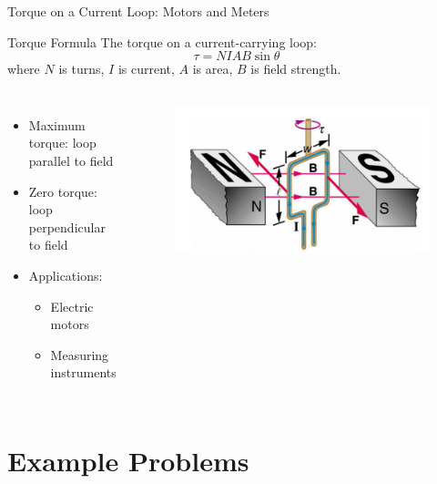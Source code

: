 \documentclass{beamer}
\begin{document}
\begin{frame}{Torque on a Current Loop: Motors and Meters}
\begin{block}{Torque Formula}
The torque on a current-carrying loop:
\begin{equation}
\tau = NIAB\sin\theta
\end{equation}
where $N$ is turns, $I$ is current, $A$ is area, $B$ is field strength.
\end{block}

\begin{columns}
\begin{itemize}
\item Maximum torque: loop parallel to field
\item Zero torque: loop perpendicular to field
\item Applications:
\begin{itemize}
\item Electric motors
\item Measuring instruments
\end{itemize}
\end{itemize}

\begin{figure}
\centering
\includegraphics[width=0.9\linewidth]{phys12-magnetism-torque-on-current-loop.png}
\end{figure}
\end{columns}
\end{frame}

\section{Example Problems}
\end{document}
